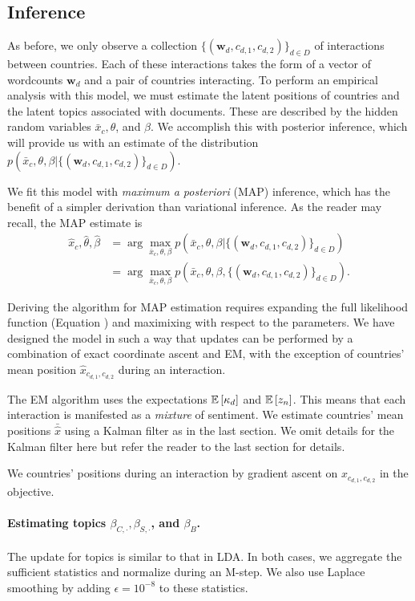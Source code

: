 \subsection{Inference}
As before, we only observe a collection $\{ (\bm w_d, c_{d,1},
c_{d,2}) \}_{d \in D}$ of interactions between countries.  Each of
these interactions takes the form of a vector of wordcounts $\bm w_d$
and a pair of countries interacting.  To perform an empirical analysis
with this model, we must estimate the latent positions of countries
and the latent topics associated with documents.  These are described
by the hidden random variables $\bar x_c, \theta$, and $\beta$.
We accomplish this with posterior inference, which will provide us
with an estimate of the distribution $p(\bar x_c, \theta, \beta |
\{ (\bm w_d, c_{d,1}, c_{d,2}) \}_{d \in D})$.

We fit this model with \emph{maximum a posteriori} (MAP) inference,
which has the benefit of a simpler derivation than variational
inference.  As the reader may recall, the MAP estimate is
\begin{align}
  \hat x_c, \hat \theta, \hat \beta &
  = \arg \max_{\bar x_c, \theta, \beta} p(\bar x_c, \theta, \beta | \{ (\bm w_d, c_{d,1}, c_{d,2}) \}_{d \in D}) \nonumber \\
  & = \arg \max_{\bar x_c, \theta, \beta} p(\bar x_c, \theta, \beta, \{ (\bm w_d, c_{d,1}, c_{d,2}) \}_{d \in D}). \label{equation:fr_unsupervised_map_likelihood}
\end{align}

Deriving the algorithm for MAP estimation requires expanding the full likelihood
function (Equation ) and maximixing with respect to the parameters.  We have
designed the model in such a way that updates can be performed by a combination of exact coordinate ascent and EM, with the exception of countries' mean position $\hat x_{c_{d,1}, c_{d,2}}$ during an interaction.

The EM algorithm uses the expectations $\mathbb{E}\left[\kappa_d\right]$ and
$\mathbb{E}\left[z_n\right]$.  This means that each interaction is manifested as a
\emph{mixture} of sentiment.  We estimate countries' mean positions
$\bar \hat x$ using a Kalman filter \cite{kalman:1960} as in the last
section.  We omit details for the Kalman filter here but refer the
reader to the last section for details.

We countries' positions during an interaction by gradient ascent on
$x_{c_{d,1}, c_{d,2}}$ in the objective.

\paragraph{Estimating topics $\beta_{C, \cdot}, \beta_{S, \cdot}$, and $\beta_{B}$.}
The update for topics is similar to that in LDA.  In both cases, we
aggregate the sufficient statistics and normalize during an M-step.
We also use Laplace smoothing by adding $\epsilon=10^{-8}$ to these
statistics.

